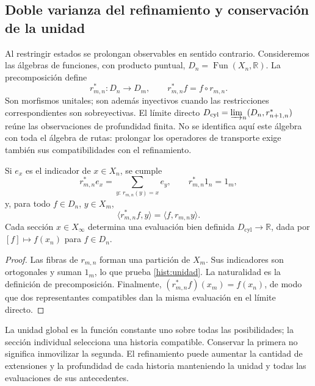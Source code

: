 \subsection{Doble varianza del refinamiento y conservación de la unidad}
\label{hist:doble-varianza}

Al restringir estados se prolongan observables en sentido contrario.
Consideremos las álgebras de funciones, con producto puntual,
\(D_n=\operatorname{Fun}(X_n,\mathbb R)\). La precomposición define
\begin{equation}
 r_{m,n}^*:D_n\longrightarrow D_m,
 \qquad r_{m,n}^*f=f\circ r_{m,n}.
 \label{hist:precomposicion}
\end{equation}
Son morfismos unitales; son además inyectivos cuando las restricciones
correspondientes son sobreyectivas. El límite directo
\(D_{\mathrm{cyl}}=\varinjlim_n(D_n,r_{n+1,n}^*)\) reúne las
observaciones de profundidad finita. No se identifica aquí este álgebra
con toda el álgebra de rutas: prolongar los operadores de transporte exige
también sus compatibilidades con el refinamiento.

\begin{lemma}
Si \(e_x\) es el indicador de \(x\in X_n\), se cumple
\begin{equation}
 r_{m,n}^*e_x=\sum_{y:\,r_{m,n}(y)=x}e_y,
 \qquad r_{m,n}^*1_n=1_m,
 \label{hist:unidad}
\end{equation}
y, para todo \(f\in D_n\), \(y\in X_m\),
\[
 \langle r_{m,n}^*f,y\rangle=\langle f,r_{m,n}y\rangle.
\]
Cada sección \(x\in X_\infty\) determina una evaluación bien definida
\(D_{\mathrm{cyl}}\to\mathbb R\), dada por \([f]\mapsto f(x_n)\)
para \(f\in D_n\).
\end{lemma}
\begin{proof}
Las fibras de \(r_{m,n}\) forman una partición de \(X_m\). Sus
indicadores son ortogonales y suman \(1_m\), lo que prueba
\eqref{hist:unidad}. La naturalidad es la definición de precomposición.
Finalmente, \((r_{m,n}^*f)(x_m)=f(x_n)\), de modo que dos representantes
compatibles dan la misma evaluación en el límite directo.
\end{proof}

La unidad global es la función constante uno sobre todas las posibilidades;
la sección individual selecciona una historia compatible. Conservar la
primera no significa inmovilizar la segunda. El refinamiento puede aumentar
la cantidad de extensiones y la profundidad de cada historia manteniendo
la unidad y todas las evaluaciones de sus antecedentes.

